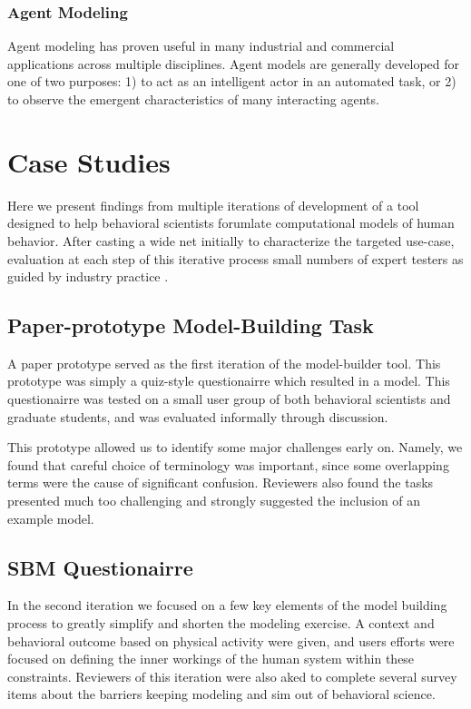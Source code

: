 \documentclass[conference]{IEEEtran}
\begin{document}
\subsubsection{Agent Modeling}
Agent modeling has proven useful in many industrial and commercial applications across multiple disciplines. \cite{metzger2011survey, macal2011introductory}
Agent models are generally developed for one of two purposes: 1) to act as an intelligent actor in an automated task, or 2) to observe the emergent characteristics of many interacting agents. 



\section{Case Studies}
Here we present findings from multiple iterations of development of a tool designed to help behavioral scientists forumlate computational models of human behavior.
After casting a wide net initially to characterize the targeted use-case, evaluation at each step of this iterative process small numbers of expert testers as guided by industry practice \cite{nielsen2000}.

\subsection{Paper-prototype Model-Building Task}
A paper prototype served as the first iteration of the model-builder tool.
This prototype was simply a quiz-style questionairre which resulted in a model.
This questionairre was tested on a small user group of both behavioral scientists and graduate students, and was evaluated informally through discussion.

This prototype allowed us to identify some major challenges early on.
Namely, we found that careful choice of terminology was important, since some overlapping terms were the cause of significant confusion.
Reviewers also found the tasks presented much too challenging and strongly suggested the inclusion of an example model.

   
\subsection{SBM Questionairre}
In the second iteration we focused on a few key elements of the model building process to greatly simplify and shorten the modeling exercise.
A context and behavioral outcome based on physical activity were given, and users efforts were focused on defining the inner workings of the human system within these constraints.
Reviewers of this iteration were also aked to complete several survey items about the barriers keeping modeling and sim out of behavioral science.
\end{document}
